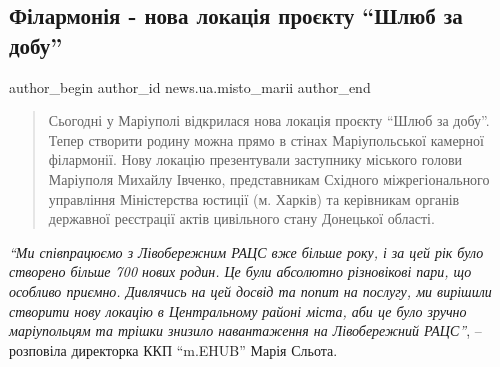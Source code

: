  
 
 
 
 
 
\subsection{Філармонія - нова локація проєкту \enquote{Шлюб за добу}}
\label{sec:30_09_2021.stz.news.ua.misto_marii.1.filarmonia_nova_lokacia_shlub_za_dobu}
 
\ifcmt
 author_begin
   author_id news.ua.misto_marii
 author_end
\fi

\begin{quote}
Сьогодні у Маріуполі відкрилася нова локація проєкту \enquote{Шлюб за добу}. Тепер
створити родину можна прямо в стінах Маріупольської камерної філармонії. Нову
локацію презентували заступнику міського голови Маріуполя Михайлу Івченко,
представникам Східного міжрегіонального управління Міністерства юстиції (м.
Харків) та керівникам органів державної реєстрації актів цивільного стану
Донецької області.	
\end{quote}


\emph{\enquote{Ми співпрацюємо з Лівобережним РАЦС вже більше року, і за цей рік було
створено більше 700 нових родин. Це були абсолютно різновікові пари, що
особливо приємно. Дивлячись на цей досвід та попит на послугу, ми вирішили
створити нову локацію в Центральному районі міста, аби це було зручно
маріупольцям та трішки знизило навантаження на Лівобережний РАЦС}}, – розповіла
директорка ККП \enquote{m.EHUB} Марія Сльота.


